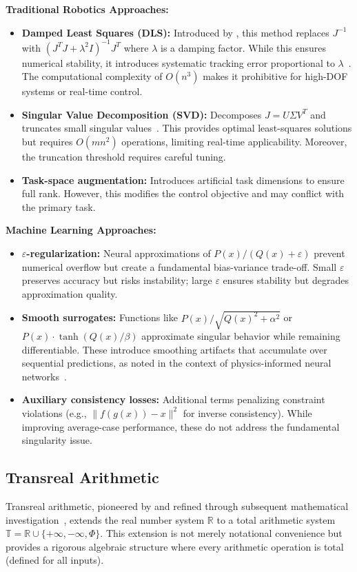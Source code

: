 \documentclass[twoside,11pt]{article}
\begin{document}
\textbf{Traditional Robotics Approaches:}
\begin{itemize}
\item \textbf{Damped Least Squares (DLS):} Introduced by \citet{wampler1986manipulator}, this method replaces $J^{-1}$ with $(J^TJ + \lambda^2I)^{-1}J^T$ where $\lambda$ is a damping factor. While this ensures numerical stability, it introduces systematic tracking error proportional to $\lambda$~\citep{dls1977damped}. The computational complexity of $O(n^3)$ makes it prohibitive for high-DOF systems or real-time control.
\item \textbf{Singular Value Decomposition (SVD):} Decomposes $J = U\Sigma V^T$ and truncates small singular values~\citep{golub2013matrix}. This provides optimal least-squares solutions but requires $O(mn^2)$ operations, limiting real-time applicability. Moreover, the truncation threshold requires careful tuning.
\item \textbf{Task-space augmentation:} Introduces artificial task dimensions to ensure full rank. However, this modifies the control objective and may conflict with the primary task.
\end{itemize}

\textbf{Machine Learning Approaches:}
\begin{itemize}
\item \textbf{$\varepsilon$-regularization:} Neural approximations of $P(x)/(Q(x)+\varepsilon)$ prevent numerical overflow but create a fundamental bias-variance trade-off. Small $\varepsilon$ preserves accuracy but risks instability; large $\varepsilon$ ensures stability but degrades approximation quality.
\item \textbf{Smooth surrogates:} Functions like $P(x)/\sqrt{Q(x)^2 + \alpha^2}$ or $P(x)\cdot\tanh(Q(x)/\beta)$ approximate singular behavior while remaining differentiable. These introduce smoothing artifacts that accumulate over sequential predictions, as noted in the context of physics-informed neural networks~\citep{wang2021understanding}.
\item \textbf{Auxiliary consistency losses:} Additional terms penalizing constraint violations (e.g., $\|f(g(x)) - x\|^2$ for inverse consistency). While improving average-case performance, these do not address the fundamental singularity issue.
\end{itemize}
\subsection{Transreal Arithmetic}
Transreal arithmetic, pioneered by \citet{anderson2006perspex} and refined through subsequent mathematical investigation~\citep{reis2016transreal,anderson2019transmathematics}, extends the real number system $\mathbb{R}$ to a total arithmetic system $\mathbb{T} = \mathbb{R} \cup \{+\infty, -\infty, \Phi\}$. This extension is not merely notational convenience but provides a rigorous algebraic structure where every arithmetic operation is total (defined for all inputs).
\end{document}
